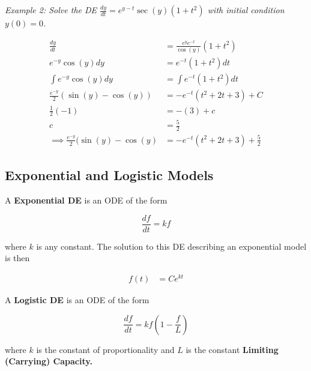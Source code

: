         \noindent \color{blue} \textit{Example 2: Solve the DE $\frac{dy}{dt}=e^{y-t}\sec{(y)}
        (1+t^2)$ with initial condition $y(0)=0$.} \color{black}

        \begin{align*}
            \frac{dy}{dt}                                   &= \frac{e^y e^{-t}}{\cos{(y)}}(1+t^2) \\
            e^{-y}\cos{(y)}dy                               &= e^{-t}(1+t^2)dt \\
            \int e^{-y}\cos{(y)}dy                          &= \int e^{-t}(1+t^2)dt \\
            \frac{e^{-y}}{2}(\sin{(y)}-\cos{(y)})           &= -e^{-t}(t^2+2t+3)+C \\
            \frac{1}{2}(-1)                                 &= -(3)+c \\
            c                                               &= \frac{5}{2} \\
            \implies \frac{e^{-y}}{2}(\sin{(y)}-\cos{(y)}   &= -e^{-t}(t^2+2t+3)+\frac{5}{2}
        \end{align*}


    \subsection{Exponential and Logistic Models}
        A \color{purple} \textbf{Exponential DE} \color{black} is an ODE of the form

        \begin{equation*}
            \frac{df}{dt} = kf
        \end{equation*}

        \noindent where $k$ is any constant. The solution to this DE describing an exponential
        model is then

        \begin{align*}
            f(t) &= Ce^{kt}
        \end{align*}

        \noindent A \color{purple} \textbf{Logistic DE} \color{black} is an ODE of the form

        \begin{equation*}
            \frac{df}{dt} = kf\left(1-\frac{f}{L}\right)
        \end{equation*}

        \noindent where $k$ is the constant of proportionality and $L$ is the constant
        \color{purple} \textbf{Limiting (Carrying) Capacity.} \color{black} \\

